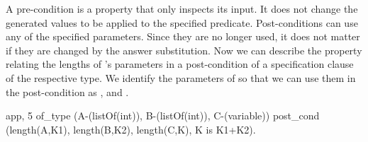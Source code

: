 A pre-condition is a property that only inspects its input.
%
It does not change the generated values to be applied to the specified
predicate.
%
Post-conditions can use any of the specified parameters.
%
Since they are no longer used, it does not matter if they are changed by
the answer substitution.
%
Now we can describe the property relating the lengths of 's
parameters in a post-condition of a specification clause of the
respective type.
%
We identify the parameters of  so that we can use them in the
post-condition as ,   and  .
%
\begin{yapcode}
 {app, 5} of_type (A-(listOf(int)), B-(listOf(int)), C-(variable))
   post_cond (length(A,K1), length(B,K2), length(C,K), K is K1+K2).
\end{yapcode}

